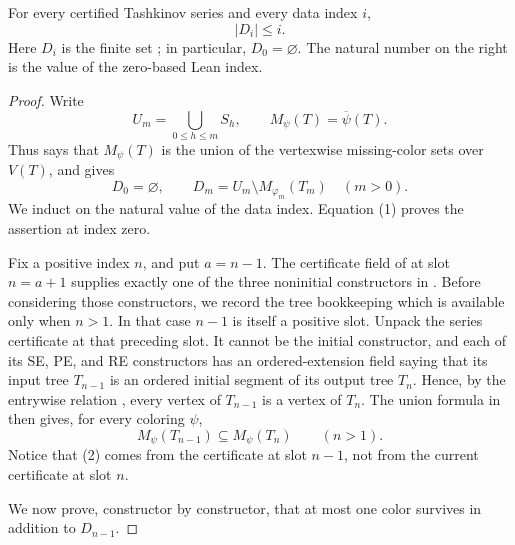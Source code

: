 \begin{lemma}
For every certified Tashkinov series and every data index \(i\),
\[
 |D_i|\leq i.
\]
Here \(D_i\) is the finite set ; in
particular, \(D_0=\varnothing\).  The natural number on the right is the
value of the zero-based Lean index.
\end{lemma}
\begin{proof}
Write
\[
 U_m=\bigcup_{0\leq h\leq m}S_h,
 \qquad M_\psi(T)=\overline\psi(T).
\]
Thus  says that \(M_\psi(T)\) is the union of
the vertexwise missing-color sets over \(V(T)\), and
 gives
\[
 D_0=\varnothing,
 \qquad D_m=U_m\setminus M_{\varphi_m}(T_m)\quad(m>0).            \tag{1}
\]
We induct on the natural value of the data index.  Equation (1) proves
the assertion at index zero.

Fix a positive index \(n\), and put \(a=n-1\).  The certificate field of
 at slot \(n=a+1\) supplies exactly one of the
three noninitial constructors in .  Before
considering those constructors, we record the tree bookkeeping which is
available only when \(n>1\).  In that case \(n-1\) is itself a positive
slot.  Unpack the series certificate at that preceding slot.  It cannot
be the initial constructor, and each of its SE, PE, and RE constructors
has an ordered-extension field saying that its input tree \(T_{n-1}\)
is an ordered initial segment of its output tree \(T_n\).  Hence, by the
entrywise relation , every vertex of
\(T_{n-1}\) is a vertex of \(T_n\).  The union formula in
 then gives, for every coloring \(\psi\),
\[
 M_\psi(T_{n-1})\subseteq M_\psi(T_n)\qquad(n>1).                \tag{2}
\]
Notice that (2) comes from the certificate at slot \(n-1\), not from the
current certificate at slot \(n\).

We now prove, constructor by constructor, that at most one color survives
in addition to \(D_{n-1}\).


\end{proof}
